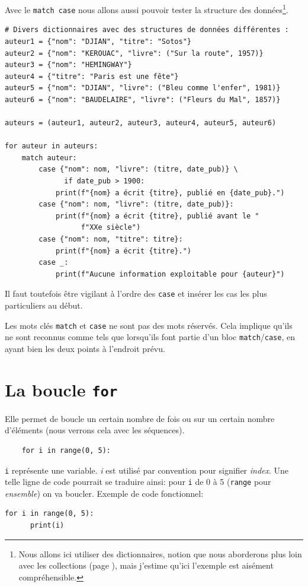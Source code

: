 \documentclass[a4paper,11pt]{book}
\begin{document}
Avec le \texttt{match case} nous allons aussi pouvoir tester la structure des données\footnote{Nous allons ici utiliser des dictionnaires, notion que nous aborderons plus loin avec les collections (page \pageref{collections}), mais j'estime qu'ici l'exemple est aisément compréhensible.}.
\begin{lstlisting}
# Divers dictionnaires avec des structures de données différentes :
auteur1 = {"nom": "DJIAN", "titre": "Sotos"}
auteur2 = {"nom": "KEROUAC", "livre": ("Sur la route", 1957)}
auteur3 = {"nom": "HEMINGWAY"}
auteur4 = {"titre": "Paris est une fête"}
auteur5 = {"nom": "DJIAN", "livre": ("Bleu comme l'enfer", 1981)}
auteur6 = {"nom": "BAUDELAIRE", "livre": ("Fleurs du Mal", 1857)}

auteurs = (auteur1, auteur2, auteur3, auteur4, auteur5, auteur6)

for auteur in auteurs:
    match auteur:
        case {"nom": nom, "livre": (titre, date_pub)} \
              if date_pub > 1900:
            print(f"{nom} a écrit {titre}, publié en {date_pub}.")
        case {"nom": nom, "livre": (titre, date_pub)}:
            print(f"{nom} a écrit {titre}, publié avant le "
                  f"XXe siècle")
        case {"nom": nom, "titre": titre}:
            print(f"{nom} a écrit {titre}.")
        case _:
            print(f"Aucune information exploitable pour {auteur}")
\end{lstlisting}
\medskip

Il faut toutefois être vigilant à l'ordre des \texttt{case} et insérer les cas les plus particuliers au début.
\medskip

Les mots clés \texttt{match} et \texttt{case} ne sont pas des mots réservés. Cela implique qu'ils ne sont reconnus comme tels que lorsqu'ils font partie d'un bloc \texttt{match}/\texttt{case}, en ayant bien les deux points à l'endroit prévu.
\medskip

\chapter{La boucle \texttt{for}}
Elle permet de boucle un certain nombre de fois ou sur un certain nombre d'éléments (nous verrons cela avec les séquences).
\medskip

\begin{verbatim}
    for i in range(0, 5):
\end{verbatim}
\medskip

\texttt{i} représente une variable. \textit{i} est utilisé par convention pour signifier \textit{index}. Une telle ligne de code pourrait se traduire ainsi: pour \texttt{i} de 0 à 5 (\texttt{range} pour \textit{ensemble}) on va boucler. Exemple de code fonctionnel:
\begin{lstlisting}[caption=Un premier exemple avec une boucle \texttt{for}]
  for i in range(0, 5):
  	  print(i)
\end{lstlisting}
\medskip
\end{document}
